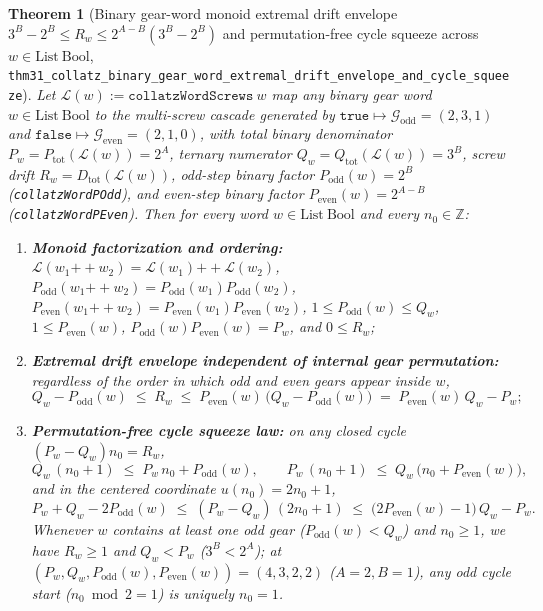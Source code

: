 \documentclass[11pt,a4paper]{article}
\newtheorem{theorem}{Theorem}[section]
\theoremstyle{definition}
\theoremstyle{remark}
\begin{document}
\begin{theorem}[Binary gear-word monoid extremal drift envelope $3^B - 2^B \le R_w \le 2^{A-B}(3^B - 2^B)$ and permutation-free cycle squeeze across $w \in \mathrm{List}\ \mathrm{Bool}$, \texttt{thm31\_collatz\_binary\_gear\_word\_extremal\_drift\_envelope\_and\_cycle\_squeeze}]
\label{thm:binary-gear-word-extremal-envelope}
Let $\mathcal{L}(w) := \texttt{collatzWordScrews}\ w$ map any binary gear word $w \in \mathrm{List}\ \mathrm{Bool}$ to the multi-screw cascade generated by $\texttt{true} \mapsto \mathcal{G}_{\mathrm{odd}}=(2,3,1)$ and $\texttt{false} \mapsto \mathcal{G}_{\mathrm{even}}=(2,1,0)$, with total binary denominator $P_w = P_{\mathrm{tot}}(\mathcal{L}(w)) = 2^A$, ternary numerator $Q_w = Q_{\mathrm{tot}}(\mathcal{L}(w)) = 3^B$, screw drift $R_w = D_{\mathrm{tot}}(\mathcal{L}(w))$, odd-step binary factor $P_{\mathrm{odd}}(w) = 2^B$ (\texttt{collatzWordPOdd}), and even-step binary factor $P_{\mathrm{even}}(w) = 2^{A-B}$ (\texttt{collatzWordPEven}). Then for every word $w \in \mathrm{List}\ \mathrm{Bool}$ and every $n_0 \in \mathbb{Z}$:
\begin{enumerate}[label=\textbf{(\roman*)},leftmargin=*,noitemsep]
\item \textbf{Monoid factorization and ordering:}
  $\mathcal{L}(w_1\mathbin{++}w_2) = \mathcal{L}(w_1)\mathbin{++}\mathcal{L}(w_2)$, $P_{\mathrm{odd}}(w_1\mathbin{++}w_2) = P_{\mathrm{odd}}(w_1)P_{\mathrm{odd}}(w_2)$, $P_{\mathrm{even}}(w_1\mathbin{++}w_2) = P_{\mathrm{even}}(w_1)P_{\mathrm{even}}(w_2)$, $1 \le P_{\mathrm{odd}}(w) \le Q_w$, $1 \le P_{\mathrm{even}}(w)$, $P_{\mathrm{odd}}(w) P_{\mathrm{even}}(w) = P_w$, and $0 \le R_w$;
\item \textbf{Extremal drift envelope independent of internal gear permutation:}
  regardless of the order in which odd and even gears appear inside $w$,
  \begin{equation}
    \label{eq:binary-gear-word-extremal-bracket}
    Q_w - P_{\mathrm{odd}}(w) \;\le\; R_w \;\le\; P_{\mathrm{even}}(w)\,\bigl(Q_w - P_{\mathrm{odd}}(w)\bigr) \;=\; P_{\mathrm{even}}(w)\,Q_w - P_w;
  \end{equation}
\item \textbf{Permutation-free cycle squeeze law:}
  on any closed cycle $(P_w - Q_w) n_0 = R_w$,
  \begin{equation}
    \label{eq:binary-gear-word-cycle-squeeze}
    Q_w\,(n_0 + 1) \;\le\; P_w\,n_0 + P_{\mathrm{odd}}(w), \qquad
    P_w\,(n_0 + 1) \;\le\; Q_w\,\bigl(n_0 + P_{\mathrm{even}}(w)\bigr),
  \end{equation}
  and in the centered coordinate $u(n_0) = 2 n_0 + 1$,
  \[
    P_w + Q_w - 2 P_{\mathrm{odd}}(w) \;\le\; (P_w - Q_w)\,(2 n_0 + 1) \;\le\; \bigl(2 P_{\mathrm{even}}(w) - 1\bigr)\,Q_w - P_w.
  \]
  Whenever $w$ contains at least one odd gear ($P_{\mathrm{odd}}(w) < Q_w$) and $n_0 \ge 1$, we have $R_w \ge 1$ and $Q_w < P_w$ ($3^B < 2^A$); at $(P_w, Q_w, P_{\mathrm{odd}}(w), P_{\mathrm{even}}(w)) = (4, 3, 2, 2)$ ($A=2, B=1$), any odd cycle start ($n_0 \bmod 2 = 1$) is uniquely $n_0 = 1$.
\end{enumerate}
\end{theorem}
\end{document}
